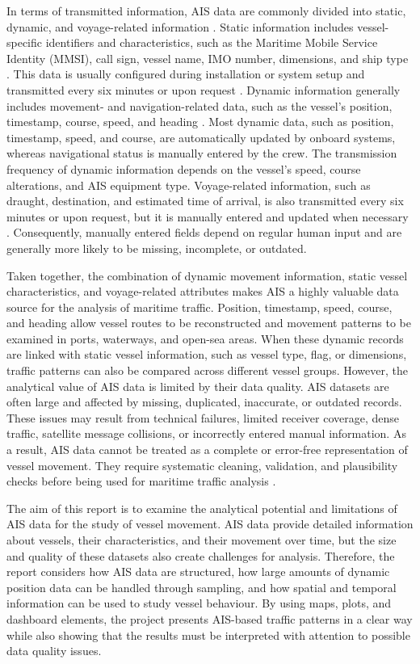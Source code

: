 \documentclass[10pt,a4paper]{article}
\begin{document}
In terms of transmitted information, AIS data are commonly divided into static, dynamic, and voyage-related information \cite{6}. Static information
includes vessel-specific identifiers and characteristics, such as the Maritime Mobile Service Identity (MMSI), call sign, vessel name, IMO number,
dimensions, and ship type \cite{1}. This data is usually configured during installation or system setup and transmitted every six minutes or upon request \cite{6}.
Dynamic information generally includes movement- and navigation-related data, such as the vessel's position, timestamp, course, speed, and heading \cite{1}. 
Most dynamic data, such as position, timestamp, speed, and course, are automatically updated by onboard systems, whereas navigational status is manually 
entered by the crew. The transmission frequency of dynamic information depends on the vessel's speed, course alterations, and AIS equipment type.
Voyage-related information, such as draught, destination, and estimated time of arrival, is also transmitted every six minutes or upon request, but it is 
manually entered and updated when necessary \cite{6}. Consequently, manually entered fields depend on regular human input and are generally more likely to be missing, 
incomplete, or outdated.

Taken together, the combination of dynamic movement information, static vessel characteristics, and voyage-related attributes makes AIS a highly valuable data source for 
the analysis of maritime traffic. Position, timestamp, speed, course, and heading allow vessel routes to be reconstructed and movement patterns to be examined in ports, 
waterways, and open-sea areas. When these dynamic records are linked with static vessel information, such as vessel type, flag, or dimensions, traffic patterns can also 
be compared across different vessel groups. However, the analytical value of AIS data is limited by their data quality. AIS datasets are often large and affected by missing,
duplicated, inaccurate, or outdated records. These issues may result from technical failures, limited receiver coverage, dense traffic, satellite message collisions, or 
incorrectly entered manual information. As a result, AIS data cannot be treated as a complete or error-free representation of vessel movement. They require systematic 
cleaning, validation, and plausibility checks before being used for maritime traffic analysis \cite{7}.

The aim of this report is to examine the analytical potential and limitations of AIS data for the study of vessel movement. AIS data provide detailed information about 
vessels, their characteristics, and their movement over time, but the size and quality of these datasets also create challenges for analysis. Therefore, 
the report considers how AIS data are structured, how large amounts of dynamic position data can be handled through sampling, and how spatial and temporal 
information can be used to study vessel behaviour. By using maps, plots, and dashboard elements, the project presents AIS-based traffic patterns in a clear way
while also showing that the results must be interpreted with attention to possible data quality issues.
\end{document}

